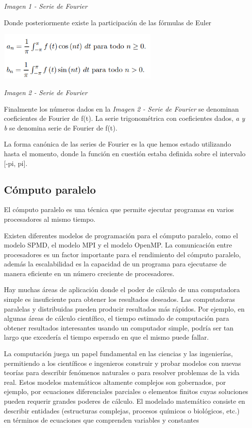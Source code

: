 \emph{Imagen 1 - Serie de Fourier}

Donde posteriormente existe la participación de las fórmulas de Euler

\includegraphics[width=3.15104in,height=0.96032in]{media/image3.png}

\emph{Imagen 2 - Serie de Fourier}

Finalmente los números dados en la \emph{Imagen 2 - Serie de Fourier} se denominan coeficientes de Fourier de f(t). La serie trigonométrica con coeficientes dados, \emph{a y b} se denomina serie de Fourier de f(t).

La forma canónica de las series de Fourier es la que hemos estado utilizando hasta el momento, donde la función en cuestión estaba definida sobre el intervalo {[}-pi, pi{]}.

\subsection{Cómputo paralelo}\label{cuxf3mputo-paralelo}

El cómputo paralelo es una técnica que permite ejecutar programas en varios procesadores al mismo tiempo.

Existen diferentes modelos de programación para el cómputo paralelo, como el modelo SPMD, el modelo MPI y el modelo OpenMP. La comunicación entre procesadores es un factor importante para el rendimiento del cómputo paralelo, además la escalabilidad es la capacidad de un programa para ejecutarse de manera eficiente en un número creciente de procesadores.

Hay muchas áreas de aplicación donde el poder de cálculo de una computadora simple es insuficiente para obtener los resultados deseados. Las computadoras paralelas y distribuidas pueden producir resultados más rápidos. Por ejemplo, en algunas áreas de cálculo científico, el tiempo estimado de computación para obtener resultados interesantes usando un computador simple, podría ser tan largo que excedería el tiempo esperado en que el mismo puede fallar.

La computación juega un papel fundamental en las ciencias y las ingenierías, permitiendo a los científicos e ingenieros construir y probar modelos con nuevas teorías para describir fenómenos naturales o para resolver problemas de la vida real. Estos modelos matemáticos altamente complejos son gobernados, por ejemplo, por ecuaciones diferenciales parciales o elementos finitos cuyas soluciones pueden requerir grandes poderes de cálculo. El modelado matemático consiste en describir entidades (estructuras complejas, procesos químicos o biológicos, etc.) en términos de ecuaciones que comprenden variables y constantes

